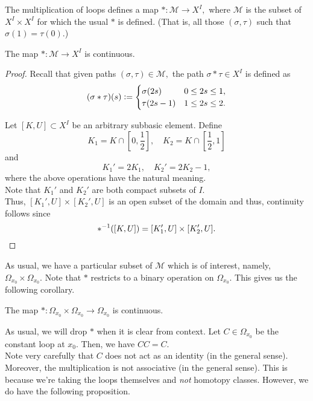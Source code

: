 \documentclass[12pt]{article}
\begin{document}
The multiplication of loops defines a map $*:\mathcal{M}\to X^I,$ where $\mathcal{M}$ is the subset of $X^I \times X^I$ for which the usual $*$ is defined. (That is, all those $(\sigma, \tau)$ such that $\sigma(1) = \tau(0).$)

\begin{prop}
	The map $*:\mathcal{M}\to X^I$ is continuous.
\end{prop}

\begin{proof} 
	Recall that given paths $(\sigma, \tau) \in \mathcal{M},$ the path $\sigma*\tau \in X^I$ is defined as
	\begin{equation*} 
		(\sigma*\tau)(s) \vcentcolon= \begin{cases}
			\sigma(2s) & 0 \le 2s \le1,\\
			\tau(2s - 1) & 1 \le 2s \le 2.
		\end{cases}
	\end{equation*}

	Let $[K, U] \subset X^I$ be an arbitrary subbasic element. Define
	\begin{equation*} 
		K_1 = K \cap \left[0, \dfrac{1}{2}\right], \quad K_2 = K \cap \left[\dfrac{1}{2}, 1\right]
	\end{equation*}
	and
	\begin{equation*} 
		K_1' = 2K_1, \quad K_2' = 2K_2 - 1,
	\end{equation*}
	where the above operations have the natural meaning.\\
	Note that $K_1'$ and $K_2'$ are both compact subsets of $I.$\\
	Thus, $[K_1', U] \times [K_2', U]$ is an open subset of the domain and thus, continuity follows since
	\begin{equation*} 
		*^{-1}([K, U]) = [K_1', U] \times [K_2', U]. \qedhere
	\end{equation*}
\end{proof}	

As usual, we have a particular subset of $\mathcal{M}$ which is of interest, namely, $\Omega_{x_0} \times \Omega_{x_0}.$ Note that $*$ restricts to a binary operation on $\Omega_{x_0}.$ This gives us the following corollary.

\begin{cor}
	The map $*:\Omega_{x_0}\times\Omega_{x_0}\to\Omega_{x_0}$ is continuous.
\end{cor}

As usual, we will drop $*$ when it is clear from context. Let $C \in \Omega_{x_0}$ be the constant loop at $x_0.$ Then, we have $CC = C.$ \\
Note very carefully that $C$ does not act as an identity (in the general sense). Moreover, the multiplication is not associative (in the general sense). This is because we're taking the loops themselves and \emph{not} homotopy classes. However, we do have the following proposition.
\end{document}

